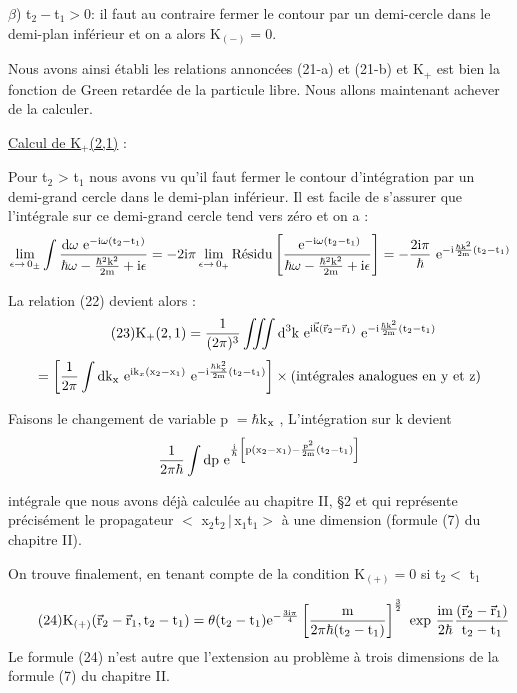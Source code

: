 $\beta$) t$_2-$t$_1>0$: il faut au contraire fermer le contour par un demi-cercle
dans le demi-plan inférieur et on a alors K$_{(-)}=0$.

Nous avons ainsi établi les relations annoncées (21-a) et (21-b) et
K$_+$ est bien la fonction de Green retardée de la particule libre. Nous
allons maintenant achever de la calculer.

\ul{Calcul de K$_+$(2,1)} :

Pour t$_2$ > t$_1$ nous avons vu qu'il faut fermer le contour
d'intégration par un demi-grand cercle dans le demi-plan inférieur.
Il est facile de s'assurer que l'intégrale sur ce demi-grand cercle
tend vers zéro et on a :
\[
\lim_{\epsilon\to\,0_\pm}\int\frac{\text{d}\omega\text{ e}^{-\text{i}\omega(\text{t}_2-\text{t}_1)}}{\hbar\omega-\frac{\hbar^2\text{k}^2}{2\text{m}}+\text{i}\epsilon}=
-2\text{i}\pi\lim_{\epsilon\to\,0_+}\text{Résidu}\left[\frac{\text{ e}^{-\text{i}\omega(\text{t}_2-\text{t}_1)}}{\hbar\omega-\frac{\hbar^2\text{k}^2}{2\text{m}}+\text{i}\epsilon}\right]=
-\frac{2\text{i}\pi}{\hbar}\text{ e}^{-\text{i}\frac{\hbar\text{k}^2}{2\text{m}}(\text{t}_2-\text{t}_1)}
\]

La relation (22) devient alors :
\[
\tag{23}\text{K}_+(2,1)=\frac{1}{(2\pi)^3}
\iiint\text{d}^3\text{k}\text{ e}^{\text{i}\vec{\text{k}}(\vec{\text{r}}_2-\vec{\text{r}}_1)}
\text{ e}^{-\text{i}\frac{\hbar\text{k}^2}{2\text{m}}(\text{t}_2-\text{t}_1)}
\]
\[
=\left[\frac{1}{2\pi}
\int\text{d}\text{k}_{\text{x}}\text{ e}^{\text{i}\text{k}_x(\text{x}_2-\text{x}_1)}
\text{ e}^{-\text{i}\frac{\hbar\text{k}_{\text{x}}^2}{2\text{m}}(\text{t}_2-\text{t}_1)}\right]\times
\text{(intégrales analogues en y et z)}
\]


Faisons le changement de variable p $=\hbar$k$_{\text{x}}$ , L'intégration sur k devient
\[
\frac{1}{2\pi\hbar}
\int\text{d}\text{p}\text{ e}^{\frac{\text{i}}{\hbar}\left[\text{p}(\text{x}_2-\text{x}_1)
-\frac{\text{p}^2}{2\text{m}}(\text{t}_2-\text{t}_1)\right]}
\]

intégrale que nous avons déjà calculée au chapitre II, \S 2  et qui
représente précisément le propagateur $<$ x$_2$t$_2\,|\,$x$_1$t$_1>$ à une dimension
(formule (7) du chapitre II).

On trouve finalement, en tenant compte de la condition K$_{(+)}=0$ si t$_2<$ t$_1$

\[
\tag{24}\text{K}_{(+)}(\vec{\text{r}}_2-\vec{\text{r}}_1,\text{t}_2-\text{t}_1)=
\theta(\text{t}_2-\text{t}_1)\text{e}^{-\frac{3\text{i}\pi}{4}}
\left[\frac{\text{m}}{2\pi\hbar(\text{t}_2-\text{t}_1)}\right]^\frac{3}{2}
\text{ exp }\frac{\text{im}}{2\hbar}\frac{(\vec{\text{r}}_2-\vec{\text{r}}_1)}{\text{t}_2-\text{t}_1}
\]
Le formule (24) n'est autre que l'extension au problème à trois dimensions
de la formule (7) du chapitre II.


